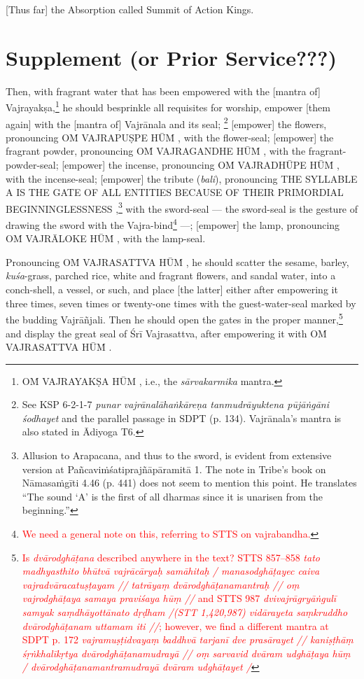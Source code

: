 \documentclass[11pt]{book}
\makeatletter
\def\fakesc#1{%
  \begingroup%
  \xdef\fake@name{\csname\curr@fontshape/\f@size\endcsname}%
  \fontsize{1.3\fontdimen8\fake@name}{\baselineskip}\selectfont%
  \uppercase{#1}%
  \endgroup%
}
\newcommand{\mantra}[1]{\fakesc{#1}}
\newcommand{\red}[1]{\textcolor{red}{#1}}
\newcommand{\skt}[1]{\emph{#1}}
\makeatother
\begin{document}
[Thus far] the Absorption called Summit of Action Kings.
 
 
\section{Supplement (or Prior Service???)}

Then, with fragrant water that has been empowered with the [mantra of] Vajrayakṣa,\footnote{\mantra{oṁ vajrayakṣa hūm}, i.e., the \emph{sārvakarmika} mantra.} he should besprinkle all requisites for worship, empower [them again] with the [mantra of] Vajrānala and its seal;%
\footnote{See KSP 6-2-1-7 \skt{punar vajrānalāhaṅkāreṇa tanmudrāyuktena pūjāṅgāni śodhayet} and the parallel passage in SDPT (p. 134). Vajrānala's mantra is also stated in Ādiyoga T6.} 
[empower] the flowers, pronouncing \mantra{oṁ vajrapuṣpe hūṁ}, with the flower-seal; 
[empower] the fragrant powder, pronouncing \mantra{oṁ vajragandhe hūṁ}, with the fragrant-powder-seal; 
[empower] the incense, pronouncing \mantra{oṁ vajradhūpe hūṁ}, with the incense-seal; 
[empower] the tribute (\skt{bali}), pronouncing \mantra{the syllable a is the gate of all entities because of their primordial beginninglessness},\footnote{Allusion to Arapacana, and thus to the sword, is evident from extensive version at Pañcaviṁśatiprajñāpāramitā 1. 
 The note in Tribe's book on Nāmasaṁgīti 4.46 (p. 441) does not seem to mention this point. He translates “The sound ‘A’ is the first of all dharmas since it is unarisen from the beginning.”} with the sword-seal — the sword-seal is the gesture of drawing the sword with the Vajra-bind\footnote{\red{We need a general note on this, referring to STTS on vajrabandha.}} —; 
 [empower] the lamp, pronouncing \mantra{oṁ vajrāloke hūṁ}, with the lamp-seal.

Pronouncing \mantra{oṁ vajrasattva hūṁ}, he should scatter the sesame, barley, \skt{kuśa}-grass, parched rice, white and fragrant flowers, and sandal water, into a conch-shell, a vessel, or such, and place [the latter] either after empowering it three times, seven times or twenty-one times with the guest-water-seal marked by the budding Vajrāñjali. Then he should open the gates in the proper manner,\footnote{\red{Is \skt{dvārodghāṭana} described anywhere in the text? 
STTS 857–858 \skt{tato madhyasthito bhūtvā vajrācāryaḥ samāhitaḥ / manasodghāṭayec caiva vajradvāracatuṣṭayam // tatrāyaṃ dvārodghāṭanamantraḥ // oṃ vajrodghāṭaya samaya praviśaya hūṃ //} and STTS 987 \skt{dvivajrāgryāṅgulī samyak saṃdhāyottānato dṛḍham /(STT 1,420,987)
vidārayeta saṃkruddho dvārodghāṭanam uttamam iti //};
however, we find a different mantra at SDPT p. 172 \skt{vajramuṣṭidvayaṃ baddhvā tarjanī dve prasārayet // kaniṣṭhāṃ śṛṅkhalīkṛtya dvārodghāṭanamudrayā //
oṃ sarvavid dvāram udghāṭaya hūṃ / dvārodghāṭanamantramudrayā dvāram udghāṭayet /}}} and display the great seal of Śrī Vajrasattva, after empowering it with \mantra{oṁ vajrasattva hūṁ}.
\end{document}
